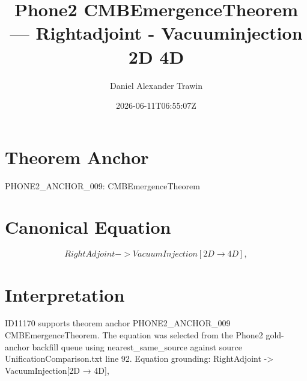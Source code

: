 \documentclass[11pt]{article}
\title{Phone2 CMBEmergenceTheorem — Rightadjoint - Vacuuminjection 2D 4D}
\author{Daniel Alexander Trawin}
\date{2026-06-11T06:55:07Z}
\begin{document}
\maketitle
\section*{Theorem Anchor}
PHONE2_ANCHOR_009: CMBEmergenceTheorem
\section*{Canonical Equation}
\[
RightAdjoint -> VacuumInjection[2D → 4D],
\]
\section*{Interpretation}
ID11170 supports theorem anchor PHONE2_ANCHOR_009 CMBEmergenceTheorem. The equation was selected from the Phone2 gold-anchor backfill queue using nearest_same_source against source UnificationComparison.txt line 92. Equation grounding: RightAdjoint -> VacuumInjection[2D → 4D],
\end{document}
